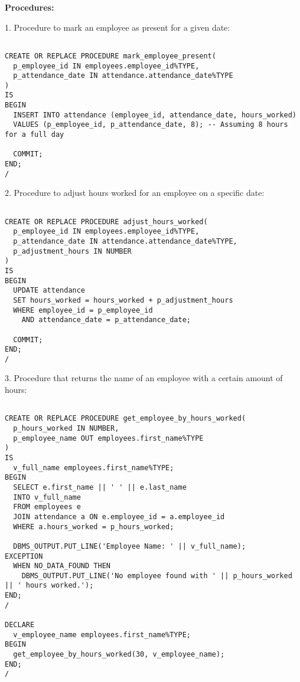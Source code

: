 \documentclass[11pt]{article} %
\begin{document}
\textbf{Procedures:}

1. Procedure to mark an employee as present for a given date:

\begin{small}
\begin{verbatim}

CREATE OR REPLACE PROCEDURE mark_employee_present(
  p_employee_id IN employees.employee_id%TYPE,
  p_attendance_date IN attendance.attendance_date%TYPE
)
IS
BEGIN
  INSERT INTO attendance (employee_id, attendance_date, hours_worked)
  VALUES (p_employee_id, p_attendance_date, 8); -- Assuming 8 hours for a full day
  
  COMMIT;
END;
/

\end{verbatim}
\end{small}

\pagebreak

2. Procedure to adjust hours worked for an employee on a specific date:

\begin{small}
\begin{verbatim}

CREATE OR REPLACE PROCEDURE adjust_hours_worked(
  p_employee_id IN employees.employee_id%TYPE,
  p_attendance_date IN attendance.attendance_date%TYPE,
  p_adjustment_hours IN NUMBER
)
IS
BEGIN
  UPDATE attendance
  SET hours_worked = hours_worked + p_adjustment_hours
  WHERE employee_id = p_employee_id
    AND attendance_date = p_attendance_date;
    
  COMMIT;
END;
/

\end{verbatim}
\end{small}

3. Procedure that returns the name of an employee with a certain amount of hours:

\begin{small}
\begin{verbatim}

CREATE OR REPLACE PROCEDURE get_employee_by_hours_worked(
  p_hours_worked IN NUMBER,
  p_employee_name OUT employees.first_name%TYPE
)
IS
  v_full_name employees.first_name%TYPE;
BEGIN
  SELECT e.first_name || ' ' || e.last_name
  INTO v_full_name
  FROM employees e
  JOIN attendance a ON e.employee_id = a.employee_id
  WHERE a.hours_worked = p_hours_worked;
  
  DBMS_OUTPUT.PUT_LINE('Employee Name: ' || v_full_name);
EXCEPTION
  WHEN NO_DATA_FOUND THEN
    DBMS_OUTPUT.PUT_LINE('No employee found with ' || p_hours_worked || ' hours worked.');
END;
/

DECLARE
  v_employee_name employees.first_name%TYPE;
BEGIN
  get_employee_by_hours_worked(30, v_employee_name);
END;
/

\end{verbatim}
\end{small}
\end{document}
